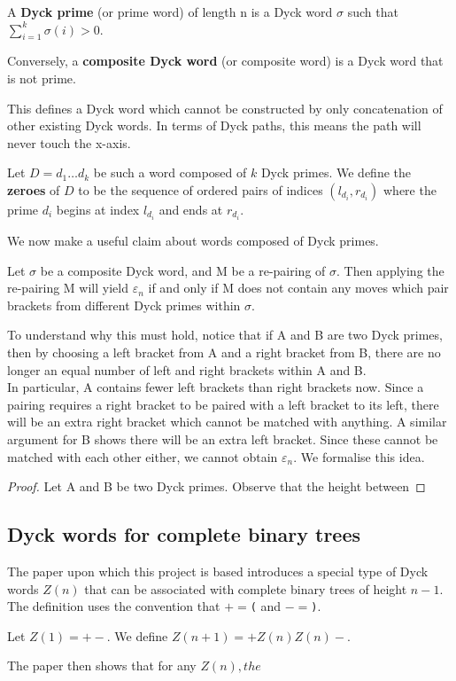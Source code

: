 \begin{definition}
    A \textbf{Dyck prime} (or prime word) of length n is a Dyck word $\sigma$ such that $\sum_{i = 1}^{k} \sigma(i) > 0$.

    Conversely, a \textbf{composite Dyck word} (or composite word) is a Dyck word that is not prime. 
\end{definition}

This defines a Dyck word which cannot be constructed by only concatenation of other existing Dyck words. In terms of Dyck paths, this means the path will never touch the x-axis. 

\begin{definition}
    Let $D = d_1\dots d_k$ be such a word composed of $k$ Dyck primes. We define the \textbf{zeroes} of $D$ to be the sequence of ordered pairs of indices $(l_{d_i}, r_{d_i})$ where the prime $d_i$ begins at index $l_{d_i}$ and ends at $r_{d_i}$.
\end{definition} 

We now make a useful claim about words composed of Dyck primes.

\begin{claim}
    \label{claim:samePrime}
    Let $\sigma$ be a composite Dyck word, and M be a re-pairing of $\sigma$. Then applying the re-pairing M will yield $\varepsilon_n$ if and only if M does not contain any moves which pair brackets from different Dyck primes within $\sigma$.
\end{claim}
To understand why this must hold, notice that if A and B are two Dyck primes, then by choosing a left bracket from A and a right bracket from B, there are no longer an equal number of left and right brackets within A and B. 
\\ In particular, A contains fewer left brackets than right brackets now. Since a pairing requires a right bracket to be paired with a left bracket to its left, there will be an extra right bracket which cannot be matched with anything. A similar argument for B shows there will be an extra left bracket. Since these cannot be matched with each other either, we cannot obtain $\varepsilon_n$. We formalise this idea.
\begin{proof}
    Let A and B be two Dyck primes. Observe that the height between 
\end{proof}

\subsection{Dyck words for complete binary trees}
The paper upon which this project is based introduces a special type of Dyck words $Z(n)$ that can be associated with complete binary trees of height $n-1$. The definition uses the convention that $+ = $\texttt{(} and $- = $\texttt{)}.
\begin{definition}
    Let $Z(1) = +-$. We define $Z(n+1) = +Z(n)Z(n)-$. 
\end{definition}
The paper then shows that for any $Z(n), the $